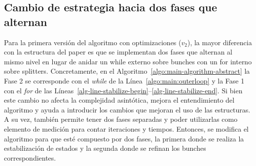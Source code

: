 \subsection{Cambio de estrategia hacia dos fases que alternan}
Para la primera versión del algoritmo con optimizaciones ($v_2$), la mayor diferencia con la estructura del paper es que se implementan dos fases que alternan al mismo nivel en lugar de anidar un while externo sobre bunches con un for interno sobre splitters. Concretamente, en el Algoritmo~\ref{algo:main-algorithm-abstract} la Fase 2 se corresponde con el \textit{while} de la Línea~\ref{algo:main:outerloop} y la Fase 1 con el \textit{for} de las Líneas~\ref{alg-line-stabilize-begin}--\ref{alg-line-stabilize-end}.
Si bien este cambio no afecta la complejidad asintótica, mejora el entendimiento del algoritmo y ayuda a introducir los cambios que mejoran el uso de las estructuras.
A su vez, también permite tener dos fases separadas y poder utilizarlas como elemento de medición para contar iteraciones y tiempos. Entonces, se modifica el algoritmo para que esté compuesto por dos fases, la primera donde se realiza la estabilización de estados y la segunda donde se refinan los bunches correspondientes. 

